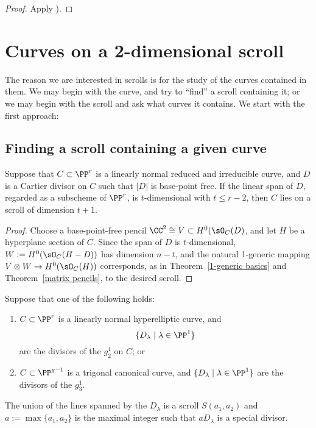 \begin{proof}
Apply \cite[II.7.12]{Hartshorne1977}).
\end{proof}



\section{Curves on a 2-dimensional scroll}\label{curves on scrolls}
The reason we are interested in scrolls is for the study of the curves contained in them.
We may begin with the curve, and try to ``find'' a scroll containing it; or we may begin with the scroll and ask
what curves it contains. We start with the first approach:

\subsection{Finding a scroll containing a given curve}

\begin{proposition}
Suppose that $C\subset \PP^r$ is a linearly normal reduced and irreducible curve, and $D$ is a  Cartier divisor on $C$ such that $|D|$ is base-point free. If the linear span of $D$, regarded as a subscheme of $\PP^{r}$, is $t$-dimensional with $t\leq r-2$, then $C$ lies on a scroll of dimension $t+1$.
\end{proposition}

\begin{proof}
Choose a base-point-free pencil $\CC^2\cong V \subset H^0(\sO_C(D)$, and let $H$ be a hyperplane section of $C$. Since the span of $D$ is $t$-dimensional, $W:=H^0(\sO_C(H-D))$ has dimension $n-t$, and the natural 1-generic mapping
$V\otimes W \to H^0(\sO_C(H))$ corresponds, as in Theorem~\ref{1-generic basics} and Theorem~\ref{matrix pencils}, to the desired scroll.
\end{proof}

\begin{corollary}\label{hyperelliptic and trigonal} Suppose that one of the following holds:
\begin{enumerate}
 \item  $C\subset \PP^r$ is a linearly normal hyperelliptic curve, and  
$$
\{D_\lambda \mid \lambda \in \PP^1\}
$$
are the divisors of the $g^1_2$ on $C$; or


\item $C\subset \PP^{g-1}$ is a trigonal canonical curve, and  
$\{D_\lambda \mid \lambda \in \PP^1\}$
are the divisors of the $g^1_3$.
\end{enumerate}

The union of the lines spanned by the $D_\lambda$
is a scroll $S(a_1,a_2)$ and $a:= \max\{a_1, a_2\}$ is the maximal integer such that
$aD_\lambda$ is a special divisor.
\end{corollary}

